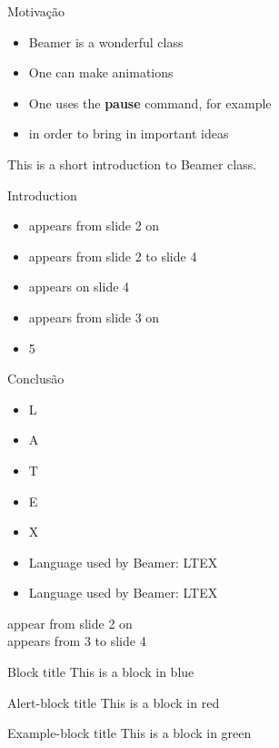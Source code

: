 \documentclass[notes,blue,mathserif]{beamer}
\begin{document}
\begin{frame}{Motiva\c{c}\~{a}o}
\begin{itemize}
\pause \item Beamer is a wonderful class
\pause \item One can make animations
\pause \item One uses the \textbf{pause} command, for example
\pause \item in order to bring in important ideas
\end{itemize}
This is a short introduction to Beamer class.
\end{frame}

\begin{frame}{Introduction}
\begin{itemize}
\item<2-> appears from slide 2 on
\item<2-4> appears from slide 2 to slide 4
\item<4> appears on slide 4
\item<3-> appears from slide 3 on
\item<5-> 5
\end{itemize}
\end{frame}

\begin{frame}{Conclus\~{a}o}
\begin{itemize}[<+->]
\item L
\item A
\item T
\item E
\item X
\end{itemize}
\end{frame}

\begin{frame}

\begin{itemize}
\item Language used by Beamer: LTEX
\item Language used by Beamer: LTEX
\end{itemize}

\end{frame}

\begin{frame}

{appear from slide 2 on\\}
{appears from 3 to slide 4\\}

\end{frame}

\begin{frame}
\begin{block}{Block title}
This is a block in blue
\end{block}

\begin{alertblock}{Alert-block title}
This is a block in red
\end{alertblock}

\begin{exampleblock}{Example-block title}
This is a block in green
\end{exampleblock}
\end{frame}
\end{document}
